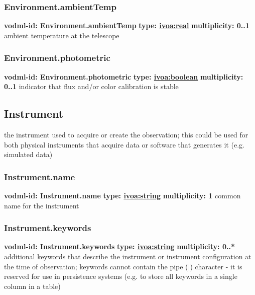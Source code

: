     \subsubsection{Environment.ambientTemp}
      \textbf{vodml-id: Environment.ambientTemp} \newline
      \textbf{type: \hyperref[sect:ivoa]{ivoa:real}} \newline
      \textbf{multiplicity: 0..1} \newline
      ambient temperature at the telescope

    \subsubsection{Environment.photometric}
      \textbf{vodml-id: Environment.photometric} \newline
      \textbf{type: \hyperref[sect:ivoa]{ivoa:boolean}} \newline
      \textbf{multiplicity: 0..1} \newline
      indicator that flux and/or color calibration is stable

  \subsection{Instrument}
  \label{sect:Instrument}
    the instrument used to acquire or create the observation; this could be used for both physical instruments that acquire data or software that generates it (e.g. simulated data)

    \subsubsection{Instrument.name}
      \textbf{vodml-id: Instrument.name} \newline
      \textbf{type: \hyperref[sect:ivoa]{ivoa:string}} \newline
      \textbf{multiplicity: 1} \newline
      common name for the instrument

    \subsubsection{Instrument.keywords}
      \textbf{vodml-id: Instrument.keywords} \newline
      \textbf{type: \hyperref[sect:ivoa]{ivoa:string}} \newline
      \textbf{multiplicity: 0..*} \newline
      additional keywords that describe the instrument or instrument configuration at the time of observation; keywords cannot contain the pipe (|) character - it is reserved for use in persistence systems (e.g. to store all keywords in a single column in a table)

